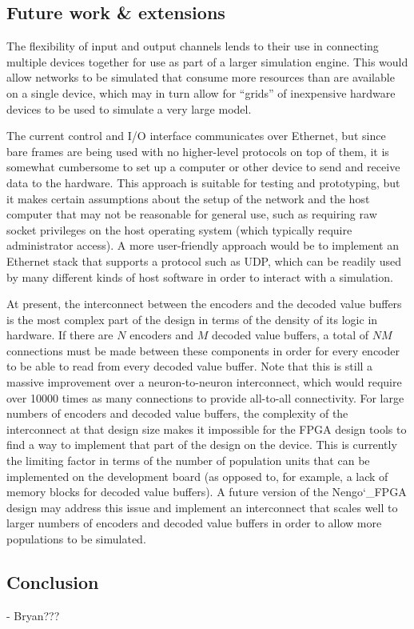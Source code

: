 \documentclass[english]{article}
\newcommand{\design}{Nengo\char`_FPGA}  %
\begin{document}
\subsection{Future work \& extensions}

The flexibility of input and output channels lends to their use in connecting multiple devices together for use as part of a larger simulation engine.
This would allow networks to be simulated that consume more resources than are available on a single device, which may in turn allow
for ``grids'' of inexpensive hardware devices to be used to simulate a very large model.

The current control and I/O interface communicates over Ethernet, but since bare frames are being used with no higher-level protocols on top of them,
it is somewhat cumbersome to set up a computer or other device to send and receive data to the hardware.
This approach is suitable for testing and prototyping, but it makes certain assumptions about the setup of the network and the host computer that
may not be reasonable for general use, such as requiring raw socket privileges on the host operating system (which typically require administrator access).
A more user-friendly approach would be to implement an Ethernet stack that supports a protocol such as UDP, which can be readily used by many different
kinds of host software in order to interact with a simulation.

At present, the interconnect between the encoders and the decoded value
buffers is the most complex part of the design in terms of the density of its logic
in hardware. If there are $N$ encoders and $M$ decoded value buffers, a total of
$NM$ connections must be made between these components in order for every
encoder to be able to read from every decoded value buffer.
Note that this is still a massive improvement over a neuron-to-neuron interconnect,
which would require over 10000 times as many connections to provide all-to-all connectivity.
For large numbers of encoders and decoded value buffers, the complexity of the interconnect at
that design size makes it impossible for the FPGA design tools to find a way to
implement that part of the design on the device. This is currently the limiting
factor in terms of the number of population units that can be implemented on
the development board (as opposed to, for example, a lack of memory blocks for
decoded value buffers). A future version of the \design{} design may address
this issue and implement an interconnect that scales well to larger numbers of
encoders and decoded value buffers in order to allow more populations to be
simulated. %

\subsection{Conclusion}

- Bryan???



\end{document}
